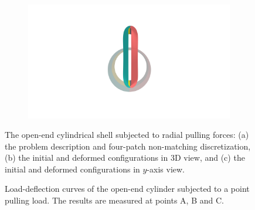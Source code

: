 \begin{figure}[h]
	\begin{subfigure}[b]{.47\textwidth}
		\centering
		\includegraphics[scale=.3,trim={22cm 8cm 22cm 3cm},clip]{cylindrical_deformed_2}
		\caption{}
	\end{subfigure}
	\caption{The open-end cylindrical shell subjected to radial pulling forces: (a) the problem description and four-patch non-matching discretization, (b) the initial and deformed configurations in 3D view, and (c) the initial and deformed configurations in $y$-axis view.}

\end{figure}

\begin{figure}[ht]
	\center
	\centering
	
	\caption{Load-deflection curves of the open-end cylinder subjected to a point pulling load. The results are measured at points A, B and C.}
	\label{fig:cylindrical_pull_result}
\end{figure}

\FloatBarrier


